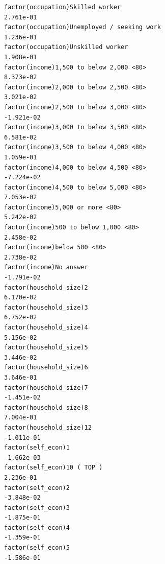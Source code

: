 \documentclass[
]{article}
\begin{document}
\begin{table}
\begin{minipage}[t]{\linewidth}
{\begin{verbatim}
factor(occupation)Skilled worker                                                   2.761e-01
factor(occupation)Unemployed / seeking work                                        1.236e-01
factor(occupation)Unskilled worker                                                 1.908e-01
factor(income)1,500 to below 2,000 <80>                                            8.373e-02
factor(income)2,000 to below 2,500 <80>                                            3.021e-02
factor(income)2,500 to below 3,000 <80>                                           -1.921e-02
factor(income)3,000 to below 3,500 <80>                                            6.581e-02
factor(income)3,500 to below 4,000 <80>                                            1.059e-01
factor(income)4,000 to below 4,500 <80>                                           -7.224e-02
factor(income)4,500 to below 5,000 <80>                                            7.053e-02
factor(income)5,000 or more <80>                                                   5.242e-02
factor(income)500 to below 1,000 <80>                                              2.458e-02
factor(income)below 500 <80>                                                       2.738e-02
factor(income)No answer                                                           -1.791e-02
factor(household_size)2                                                            6.170e-02
factor(household_size)3                                                            6.752e-02
factor(household_size)4                                                            5.156e-02
factor(household_size)5                                                            3.446e-02
factor(household_size)6                                                            3.646e-01
factor(household_size)7                                                           -1.451e-02
factor(household_size)8                                                            7.004e-01
factor(household_size)12                                                          -1.011e-01
factor(self_econ)1                                                                -1.662e-03
factor(self_econ)10 ( TOP )                                                        2.236e-01
factor(self_econ)2                                                                -3.848e-02
factor(self_econ)3                                                                -1.875e-01
factor(self_econ)4                                                                -1.359e-01
factor(self_econ)5                                                                -1.586e-01

\end{verbatim}}
\end{minipage}
\end{table}
\end{document}
